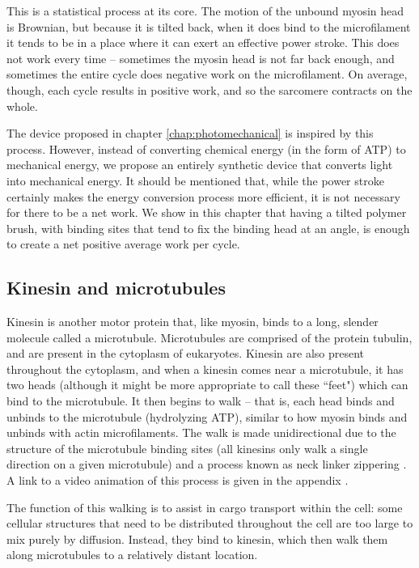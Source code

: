 \documentclass[11pt]{ucthesis}
\begin{document}
This is a statistical process at its core. The motion of the unbound myosin head is Brownian, but because it is tilted back, when it does bind to the microfilament it tends to be in a place where it can exert an effective power stroke. This does not work every time -- sometimes the myosin head is not far back enough, and sometimes the entire cycle does negative work on the microfilament. On average, though, each cycle results in positive work, and so the sarcomere contracts on the whole.

The device proposed in chapter \ref{chap:photomechanical} is inspired by this process. However, instead of converting chemical energy (in the form of ATP) to mechanical energy, we propose an entirely synthetic device that converts light into mechanical energy. It should be mentioned that, while the power stroke certainly makes the energy conversion process more efficient, it is not necessary for there to be a net work. We show in this chapter that having a tilted polymer brush, with binding sites that tend to fix the binding head at an angle, is enough to create a net positive average work per cycle.

\subsection{Kinesin and microtubules}
\label{sec:kinesinMT}

Kinesin is another motor protein that, like myosin, binds to a long, slender molecule called a microtubule. Microtubules are comprised of the protein tubulin, and are present in the cytoplasm of eukaryotes. Kinesin are also present throughout the cytoplasm, and when a kinesin comes near a microtubule, it has two heads (although it might be more appropriate to call these ``feet") which can bind to the microtubule. It then begins to walk -- that is, each head binds and unbinds to the microtubule (hydrolyzing ATP), similar to how myosin binds and unbinds with actin microfilaments. The walk is made unidirectional due to the structure of the microtubule binding sites (all kinesins only walk a single direction on a given microtubule) and a process known as neck linker zippering \cite{rice1999structural}. A link to a video animation of this process is given in the appendix \cite{vale2000way}.

The function of this walking is to assist in cargo transport within the cell: some cellular structures that need to be distributed throughout the cell are too large to mix purely by diffusion. Instead, they bind to kinesin, which then walk them along microtubules to a relatively distant location.
\end{document}
